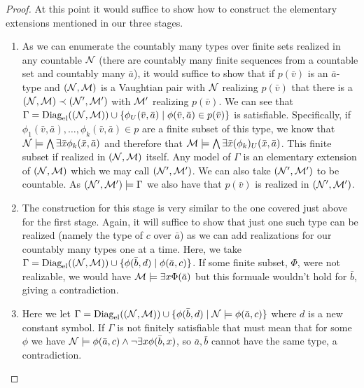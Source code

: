\begin{proof}
At this point it would suffice to show how to construct the elementary extensions mentioned in our three stages. 

\begin{enumerate}

\item As we can enumerate the countably many types over finite sets realized in any countable \(\mathcal{N}\) (there are countably many finite sequences from a countable set and countably many \(\bar{a}\)), it would suffice to show that if \(p(\bar{v})\) is an \(\bar{a}\)-type and \((\mathcal{N}, \mathcal{M})\) is a Vaughtian pair with \(\mathcal{N}\) realizing \(p(\bar{v})\) that there is a \((\mathcal{N}, \mathcal{M}) \prec (\mathcal{N}', \mathcal{M}')\) with \(\mathcal{M}'\) realizing \(p(\bar{v})\). 
We can see that \(\Gamma = \text{Diag}_\text{el}((\mathcal{N}, \mathcal{M})) \cup \{\phi_U(\bar{v}, \bar{a}) \mid \phi(\bar{v}, \bar{a}) \in  p(\bar{v})\}\) is satisfiable.  
Specifically, if \(\phi_1(\bar{v}, \bar{a}), \ldots, \phi_k(\bar{v}, \bar{a}) \in p\) are a finite subset of this type, we know that \(\mathcal{N} \models \bigwedge \exists \bar{x} \phi_k(\bar{x},\bar{a})\) and therefore that \(\mathcal{M} \models \bigwedge \exists \bar{x} (\phi_k)_U(\bar{x},\bar{a})\). 
This finite subset if realized in \((\mathcal{N}, \mathcal{M})\) itself. 
Any model of \(\Gamma\) is an elementary extension of \((\mathcal{N}, \mathcal{M})\) which we may call \((\mathcal{N}', \mathcal{M}')\).
We can also take \((\mathcal{N}', \mathcal{M}')\) to be countable. 
As \((\mathcal{N}', \mathcal{M}') \models \Gamma\) we also have that \(p(\bar{v})\) is realized in \((\mathcal{N}', \mathcal{M}')\). 

\item The construction for this stage is very similar to the one covered just above for the first stage.
Again, it will suffice to show that just one such type can be realized (namely the type of \(c\) over \(\bar{a}\)) as we can add realizations for our countably many types one at a time. 
Here, we take \(\Gamma = \text{Diag}_\text{el}((\mathcal{N}, \mathcal{M})) \cup \{\phi(\bar{b}, d) \mid \phi(\bar{a}, c)\}\). 
If some finite subset, \(\Phi\), were not realizable, we would have \(\mathcal{M} \models \exists x \Phi(\bar{a})\) but this formuale wouldn't hold for \(\bar{b}\), giving a contradiction. 

\item Here we let \(\Gamma = \text{Diag}_\text{el}((\mathcal{N}, \mathcal{M})) \cup \{\phi(\bar{b}, d) \mid \mathcal{N} \models \phi(\bar{a}, c)\}\) where \(d\) is a new constant symbol.
If \(\Gamma\) is not finitely satisfiable that must mean that for some \(\phi\) we have \(\mathcal{N} \models \phi(\bar{a}, c) \land \neg \exists x \phi(\bar{b}, x)\), 
so \(\bar{a}, \bar{b}\) cannot have the same type, a contradiction.

\end{enumerate}

\end{proof}

